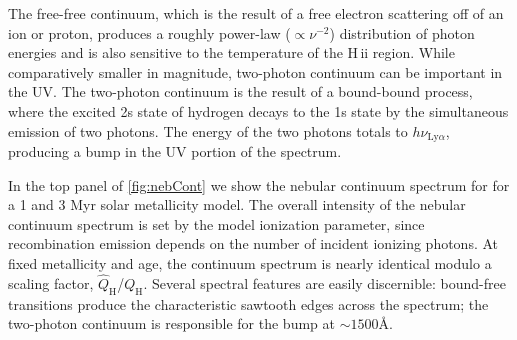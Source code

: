 \documentclass[trackchanges, twocolumn, tighten]{aastex61}
\newcommand{\Fig}[1]{\autoref{fig:#1}}
\newcommand{\hii}{H\,{\sc ii}\xspace}
\newcommand{\ang}{\ensuremath{\mbox{\AA}}}
\newcommand{\QH}{\ensuremath{Q_{\mathrm{H}}}}
\newcommand{\QHat}{\ensuremath{\hat{Q}_{\mathrm{H}}}}
\begin{document}
The free-free continuum, which is the result of a free electron scattering off of an ion or proton, produces a roughly power-law ($\propto \nu^{-2}$) distribution of photon energies and is also sensitive to the temperature of the \hii region. While comparatively smaller in magnitude, two-photon continuum can be important in the UV. The two-photon continuum is the result of a bound-bound process, where the excited 2s state of hydrogen decays to the 1s state by the simultaneous emission of two photons. The energy of the two photons totals to $h\nu_{\mathrm{Ly}\alpha}$, producing a bump in the UV portion of the spectrum.

In the top panel of \Fig{nebCont} we show the nebular continuum spectrum for for a 1 and 3 Myr solar metallicity model. The overall intensity of the nebular continuum spectrum is set by the model ionization parameter, since recombination emission depends on the number of incident ionizing photons. At fixed metallicity and age, the continuum spectrum is nearly identical modulo a scaling factor, \QHat{}/\QH{}. Several spectral features are easily discernible: bound-free transitions produce the characteristic sawtooth edges across the spectrum; the two-photon continuum is responsible for the bump at ${\sim}1500 \ang$.
\end{document}
